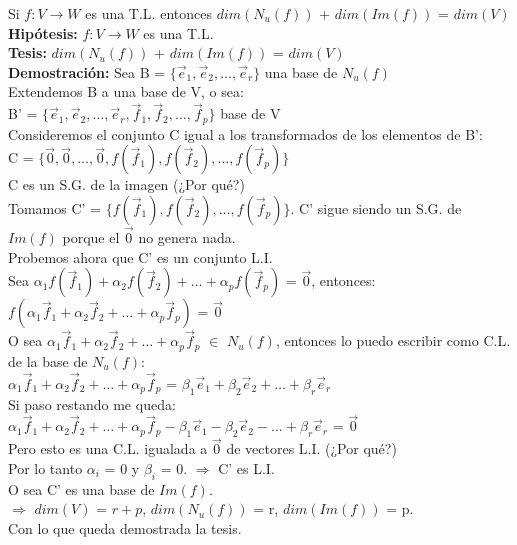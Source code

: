 \documentclass[11pt]{article}
\begin{document}
\vspace{2mm} \noindent
Si $f: V \rightarrow W$ es una T.L. entonces $dim(N_u(f))$ + $dim(Im(f))$ = $dim(V)$\\
{\bfseries Hipótesis:} $f: V \rightarrow W$ es una T.L. \\
{\bfseries Tesis:} $dim(N_u(f))$ + $dim(Im(f))$ = $dim(V)$ \\
{\bfseries Demostración:} Sea B = $\{\vec{e}_1, \vec{e}_2, \hdots, \vec{e}_r\}$ una base de $N_u(f)$ \\
Extendemos B a una base de V, o sea: \\
B' = $\{\vec{e}_1, \vec{e}_2, \hdots, \vec{e}_r, \vec{f}_1, \vec{f}_2, \hdots, \vec{f}_p\}$ base de V \\
Consideremos el conjunto C igual a los transformados de los elementos de B':\\
C = $\{\vec{0}, \vec{0}, \hdots, \vec{0}, f(\vec{f}_1), f(\vec{f}_2), \hdots, f(\vec{f}_p)\}$\\
C es un S.G. de la imagen (¿Por qué?)\\
Tomamos C' = $\{f(\vec{f}_1), f(\vec{f}_2), \hdots, f(\vec{f}_p)\}$. C' sigue siendo un S.G. de $Im(f)$ porque el $\vec{0}$ no genera nada. \\
Probemos ahora que C' es un conjunto L.I.\\
Sea $\alpha_1 f(\vec{f}_1) + \alpha_2 f(\vec{f}_2) + \hdots + \alpha_p f(\vec{f}_p)$ = $\vec{0}$, entonces: \\
$f(\alpha_1 \vec{f}_1 + \alpha_2 \vec{f}_2 + \hdots + \alpha_p \vec{f}_p)$ = $\vec{0}$ \\
O sea $\alpha_1 \vec{f}_1 + \alpha_2 \vec{f}_2 + \hdots + \alpha_p \vec{f}_p$ $\in$ $N_u(f)$, entonces lo puedo escribir como C.L. de la base de $N_u(f)$: \\
$\alpha_1 \vec{f}_1 + \alpha_2 \vec{f}_2 + \hdots + \alpha_p \vec{f}_p$ = $\beta_1 \vec{e}_1 + \beta_2 \vec{e}_2 + \hdots + \beta_r \vec{e}_r$ \\
Si paso restando me queda: \\
$\alpha_1 \vec{f}_1 + \alpha_2 \vec{f}_2 + \hdots + \alpha_p \vec{f}_p - \beta_1 \vec{e}_1 - \beta_2 \vec{e}_2 - \hdots + \beta_r \vec{e}_r $ = $\vec{0}$ \\
Pero esto es una C.L. igualada a $\vec{0}$ de vectores L.I. (¿Por qué?) \\
Por lo tanto $\alpha_i$ = 0 y $\beta_i$ = 0. $\Rightarrow$ C' es L.I. \\
O sea C' es una base de $Im(f)$.\\
$\Rightarrow$ $dim(V)$ = $r+p$, $dim(N_u(f))$ = r, $dim(Im(f))$ = p.\\
Con lo que queda demostrada la tesis.
\end{document}
